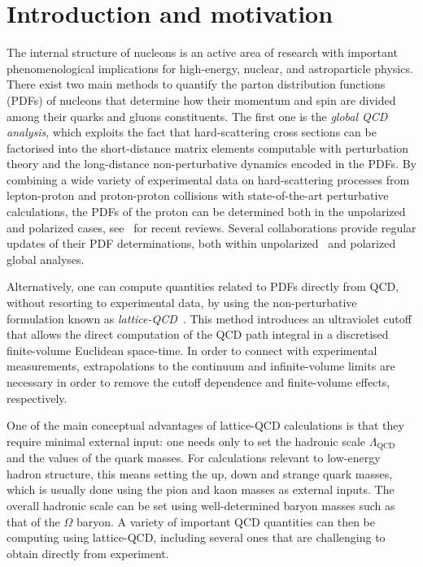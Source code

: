 \section{Introduction and motivation}

The internal structure of nucleons is an active area of research
with important phenomenological implications for
high-energy, nuclear, and astroparticle physics.
%
There exist two main methods to quantify the parton distribution functions (PDFs)
of nucleons that determine how their momentum and spin 
are divided among their quarks and gluons constituents.
%
The first one
is the {\it global QCD analysis}, which exploits the fact that hard-scattering
cross sections can be factorised into the short-distance matrix elements
computable with perturbation theory and the long-distance
non-perturbative dynamics encoded in the PDFs.
%
By combining a wide variety of experimental data on hard-scattering processes
from lepton-proton and proton-proton collisions
with state-of-the-art perturbative calculations,
the PDFs of the proton can be determined
both in the unpolarized and polarized cases,
see~\cite{Perez:2012um,DeRoeck:2011na,Alekhin:2011sk,Ball:2012wy,
Forte:2013wc,Jimenez-Delgado:2013sma,Rojo:2015acz,Butterworth:2015oua,
Accardi:2016ndt,Gao:2017yyd}
for recent reviews.
%
Several collaborations provide regular updates of
their PDF determinations, both
within unpolarized~\cite{Ball:2017nwa,Harland-Lang:2014zoa,
  Dulat:2015mca,Alekhin:2017kpj,Accardi:2016qay} and polarized~\cite{Nocera:2014gqa,deFlorian:2009vb,
  Sato:2016tuz,Hirai:2008aj} global analyses.

Alternatively, one can compute quantities related to PDFs directly 
from QCD, without resorting to
experimental data, by using the non-perturbative formulation known as
{\it lattice-QCD}~\cite{Olive:2016xmw,Gupta:1997nd}.
%
This method introduces an ultraviolet cutoff that allows the direct 
computation of the QCD path integral in a discretised finite-volume 
Euclidean space-time.
%
In order to connect with experimental measurements, extrapolations to the 
continuum and infinite-volume limits are necessary in order to remove the  
cutoff dependence and finite-volume effects, respectively.

One of the main
conceptual advantages of lattice-QCD calculations is that
they require minimal external input: one needs only to 
set the hadronic scale $\Lambda_\text{QCD}$ and the values of the quark masses.
%
For calculations relevant to low-energy hadron structure, this means
setting the up, down and strange quark masses,
which is usually done using the pion and kaon masses as external inputs.
%
The overall hadronic scale can be set using well-determined baryon masses 
such as that of the $\Omega$ baryon.
%
A variety of important
QCD quantities can then be computing using lattice-QCD, including 
several ones that are challenging to obtain directly from experiment. 

